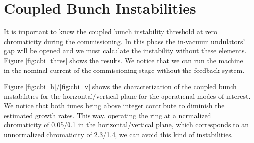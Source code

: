 
\section{Coupled Bunch Instabilities}\label{sec:coupled_bunch_instabilities}

It is important to know the coupled bunch instability threshold at zero chromaticity during the commissioning. In this phase the in-vacuum undulators' gap will be opened and we must calculate the instability without these elements. Figure \ref{fig:cbi_thres} shows the results. We notice that we can run the machine in the nominal current of the commissioning stage without the feedback system.


Figure \ref{fig:cbi_h}/\ref{fig:cbi_v} shows the characterization of the coupled bunch instabilities for the horizontal/vertical plane for the operational modes of interest. We notice that both tunes being above integer contribute to diminish the estimated growth rates. This way, operating the ring at a normalized chromaticity of 0.05/0.1 in the horizontal/vertical plane, which corresponds to an unnormalized chromaticity of 2.3/1.4, we can avoid this kind of instabilities.





